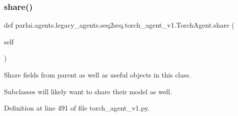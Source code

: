\subsubsection{\texorpdfstring{share()}{share()}}
{\footnotesize\ttfamily def parlai.\+agents.\+legacy\+\_\+agents.\+seq2seq.\+torch\+\_\+agent\+\_\+v1.\+Torch\+Agent.\+share (\begin{DoxyParamCaption}\item[{}]{self }\end{DoxyParamCaption})}

\begin{DoxyVerb}Share fields from parent as well as useful objects in this class.

Subclasses will likely want to share their model as well.
\end{DoxyVerb}
 

Definition at line 491 of file torch\+\_\+agent\+\_\+v1.\+py.



